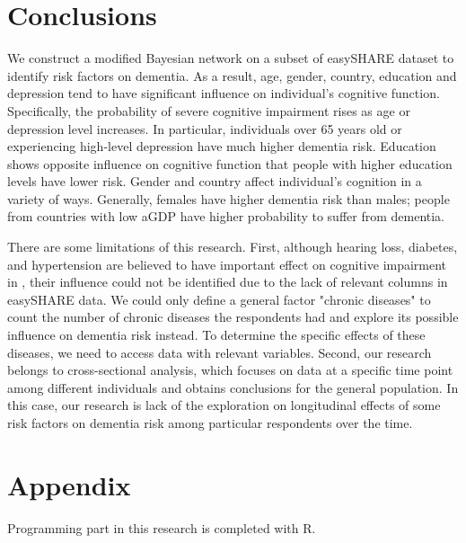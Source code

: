 \documentclass[11pt,twoside]{article}
\numberwithin{Theorem}{section}
\numberwithin{Definition}{section}
\numberwithin{Lemma}{section}
\numberwithin{Algorithm}{section}
\numberwithin{equation}{section}
\begin{document}
\clearpage

\section{Conclusions}

We construct a modified Bayesian network on a subset of easySHARE dataset to identify risk factors on dementia. As a result, age, gender, country, education and depression tend to have significant influence on individual's cognitive function. Specifically, the probability of severe cognitive impairment rises as age or depression level increases. In particular, individuals over 65 years old or experiencing high-level depression have much higher dementia risk. Education shows opposite influence on cognitive function that people with higher education levels have lower risk. Gender and country affect individual's cognition in a variety of ways. Generally, females have higher dementia risk than males; people from countries with low aGDP have higher probability to suffer from dementia.

There are some limitations of this research. First, although hearing loss, diabetes, and hypertension are believed to have important effect on cognitive impairment in \cite{livingston2017dementia}, their influence could not be identified due to the lack of relevant columns in easySHARE data. We could only define a general factor "chronic diseases" to count the number of chronic diseases the respondents had and explore its possible influence on dementia risk instead. To determine the specific effects of these diseases, we need to access data with relevant variables. Second, our research belongs to cross-sectional analysis, which focuses on data at a specific time point among different individuals and obtains conclusions for the general population. In this case, our research is lack of the exploration on longitudinal effects of some risk factors on dementia risk among particular respondents over the time.

\clearpage



\clearpage

\appendix
\section*{Appendix}

Programming part in this research is completed with R. 
\end{document}
